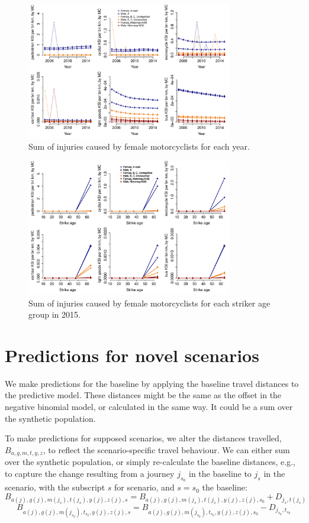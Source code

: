 \documentclass{article}
\begin{document}
\begin{figure}[H]
\centering
\includegraphics[width=0.8\textwidth]{pred6yearMC.pdf}
\caption{\small Sum of injuries caused by female motorcyclists for each year.}
\label{pred6yearMC}
\end{figure}

\begin{figure}[H]
\centering
\includegraphics[width=0.8\textwidth]{pred6Age2015MC.pdf}
\caption{\small Sum of injuries caused by female motorcyclists for each striker age group in 2015.}
\label{pred6Age2015MC}
\end{figure}

\section{Predictions for novel scenarios}

We make predictions for the baseline by applying the baseline travel distances to the predictive model. These distances might be the same as the offset in the negative binomial model, or calculated in the same way. It could be a sum over the synthetic population.

To make predictions for supposed scenarios, we alter the distances travelled, ${B}_{a,g,m,t,y,z}$, to reflect the scenario-specific travel behaviour. We can either sum over the synthetic population, or simply re-calculate the baseline distances, e.g., to capture the change resulting from a journey $j_{s_0}$ in the baseline to $j_s$ in the scenario, with the subscript $s$ for scenario, and $s=s_0$ the baseline:
$${B}_{a(j),g(j),m(j_s),t(j_s),y(j),z(j),s} = {B}_{a(j),g(j),m(j_s),t(j_s),y(j),z(j),s_0}+D_{j_s,t(j_s)}$$
$$B_{a(j),g(j),m(j_{s_0}),t_{s_0},y(j),z(j),s} = B_{a(j),g(j),m(j_{s_0}),t_{s_0},y(j),z(j),s_0}-D_{j_{s_0},t_{s_0}}$$
\end{document}
